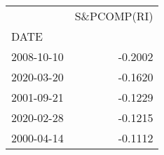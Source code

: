 \begin{tabular}{lr}
\toprule
{} &  S\&PCOMP(RI) \\
DATE       &              \\
\midrule
2008-10-10 &      -0.2002 \\
2020-03-20 &      -0.1620 \\
2001-09-21 &      -0.1229 \\
2020-02-28 &      -0.1215 \\
2000-04-14 &      -0.1112 \\
\bottomrule
\end{tabular}
